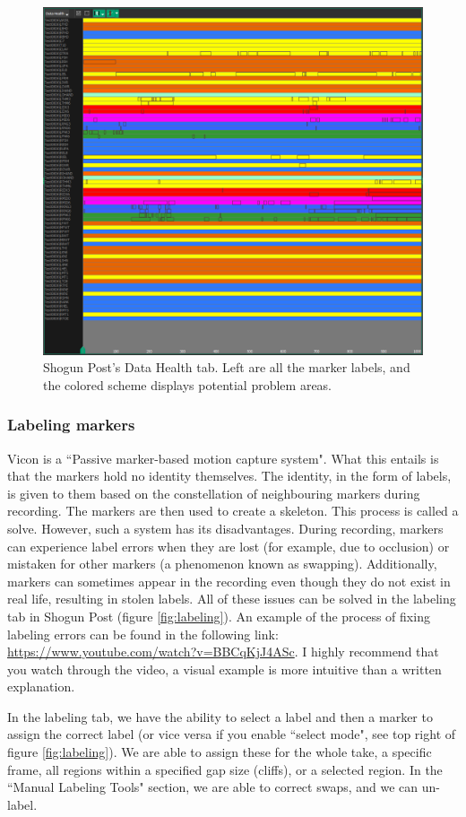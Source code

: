 \documentclass{uva-inf-article}
\begin{document}
\begin{figure}[hbt!]
    \centering
    \includegraphics[width=.8\textwidth]{imgs/datahealth.png}
    \caption{Shogun Post's Data Health tab. Left are all the marker labels, and the colored scheme displays potential problem areas.}
    \label{fig:datahealth}
\end{figure}

\subsubsection{Labeling markers}
Vicon is a ``Passive marker-based motion capture system". What this entails is that the markers hold no identity themselves. The identity, in the form of labels, is given to them based on the constellation of neighbouring markers during recording. The markers are then used to create a skeleton. This process is called a solve. However, such a system has its disadvantages. During recording, markers can experience label errors when they are lost (for example, due to occlusion) or mistaken for other markers (a phenomenon known as swapping). Additionally, markers can sometimes appear in the recording even though they do not exist in real life, resulting in stolen labels. All of these issues can be solved in the labeling tab in Shogun Post (figure \ref{fig:labeling}). An example of the process of fixing labeling errors can be found in the following link: \url{https://www.youtube.com/watch?v=BBCqKjJ4ASc}. I highly recommend that you watch through the video, a visual example is more intuitive than a written explanation.

In the labeling tab, we have the ability to select a label and then a marker to assign the correct label (or vice versa if you enable ``select mode", see top right of figure \ref{fig:labeling}). We are able to assign these for the whole take, a specific frame, all regions within a specified gap size (cliffs), or a selected region. In the ``Manual Labeling Tools" section, we are able to correct swaps, and we can un-label.
\end{document}
